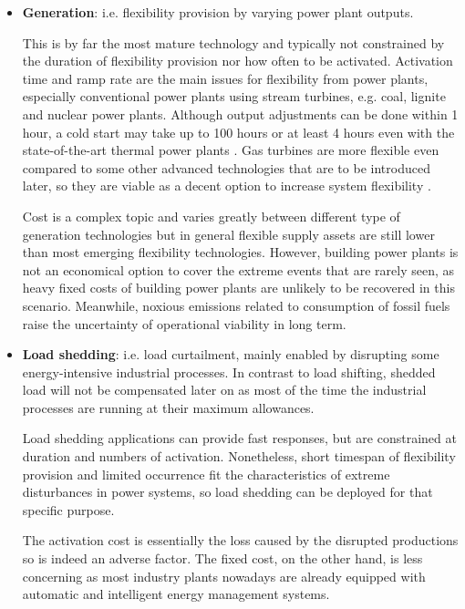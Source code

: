 \begin{itemize}
	\item \textbf{Generation}: i.e. flexibility provision by varying power plant outputs. 
	
	This is by far the most mature technology and typically not constrained by the duration of flexibility provision nor how often to be activated. Activation time and ramp rate are the main issues for flexibility from power plants, especially conventional power plants using stream turbines, e.g. coal, lignite and nuclear power plants. Although output adjustments can be done within 1 hour, a cold start may take up to 100 hours or at least 4 hours even with the state-of-the-art thermal power plants \cite{Muller2016,AgoraEnergiewende2017}. Gas turbines are more flexible even compared to some other advanced technologies that are to be introduced later, so they are viable as a decent option to increase system flexibility \cite{Muller2016}.
	
	Cost is a complex topic and varies greatly between different type of generation technologies but in general flexible supply assets are still lower than most emerging flexibility technologies. However, building power plants is not an economical option to cover the extreme events that are rarely seen, as heavy fixed costs of building power plants are unlikely to be recovered in this scenario. Meanwhile, noxious emissions related to consumption of fossil fuels raise the uncertainty of operational viability in long term.
	
	\item \textbf{Load shedding}: i.e. load curtailment, mainly enabled by disrupting some energy-intensive industrial processes. In contrast to load shifting, shedded load will not be compensated later on as most of the time the industrial processes are running at their maximum allowances.
	
	Load shedding applications can provide fast responses, but are constrained at duration and numbers of activation. Nonetheless, short timespan of flexibility provision and limited occurrence fit the characteristics of extreme disturbances in power systems, so load shedding can be deployed for that specific purpose.
	
	The activation cost is essentially the loss caused by the disrupted productions so is indeed an adverse factor. The fixed cost, on the other hand, is less concerning as most industry plants nowadays are already equipped with automatic and intelligent energy management systems.
	

\end{itemize}
